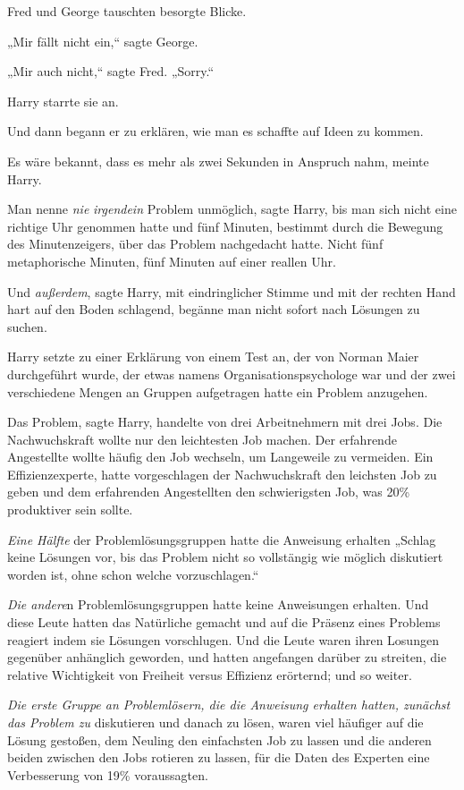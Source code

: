{Fred und George tauschten besorgte Blicke.

„Mir fällt nicht ein,“ sagte George.

„Mir auch nicht,“ sagte Fred. „Sorry.“

Harry starrte sie an.

Und dann begann er zu erklären, wie man es schaffte auf Ideen zu kommen.

Es wäre bekannt, dass es mehr als zwei Sekunden in Anspruch nahm, meinte Harry.

Man nenne \emph{nie} \emph{irgendein} Problem unmöglich, sagte Harry, bis man sich nicht eine richtige Uhr genommen hatte und fünf Minuten, bestimmt durch die Bewegung des Minutenzeigers, über das Problem nachgedacht hatte. Nicht fünf metaphorische Minuten, fünf Minuten auf einer reallen Uhr.

Und \emph{außerdem}, sagte Harry, mit eindringlicher Stimme und mit der rechten Hand hart auf den Boden schlagend, begänne man nicht sofort nach Lösungen zu suchen.

Harry setzte zu einer Erklärung von einem Test an, der von Norman Maier durchgeführt wurde, der etwas namens Organisationspsychologe war und der zwei verschiedene Mengen an Gruppen aufgetragen hatte ein Problem anzugehen.

Das Problem, sagte Harry, handelte von drei Arbeitnehmern mit drei Jobs. Die Nachwuchskraft wollte nur den leichtesten Job machen. Der erfahrende Angestellte wollte häufig den Job wechseln, um Langeweile zu vermeiden. Ein Effizienzexperte, hatte vorgeschlagen der Nachwuchskraft den leichsten Job zu geben und dem erfahrenden Angestellten den schwierigsten Job, was 20\% produktiver sein sollte.

\emph{Eine Hälfte} der Problemlösungsgruppen hatte die Anweisung erhalten „Schlag keine Lösungen vor, bis das Problem nicht so vollstängig wie möglich diskutiert worden ist, ohne schon welche vorzuschlagen.“

\emph{Die andere}n Problemlösungsgruppen hatte keine Anweisungen erhalten. Und diese Leute hatten das Natürliche gemacht und auf die Präsenz eines Problems reagiert indem sie Lösungen vorschlugen. Und die Leute waren ihren Losungen gegenüber anhänglich geworden, und hatten angefangen darüber zu streiten, die relative Wichtigkeit von Freiheit versus Effizienz erörternd; und so weiter.

\emph{Die erste Gruppe an Problemlösern, die die Anweisung erhalten hatten, zunächst das Problem zu} diskutieren und danach zu lösen, waren viel häufiger auf die Lösung gestoßen, dem Neuling den einfachsten Job zu lassen und die anderen beiden zwischen den Jobs rotieren zu lassen, für die Daten des Experten eine Verbesserung von 19\% voraussagten.

}
